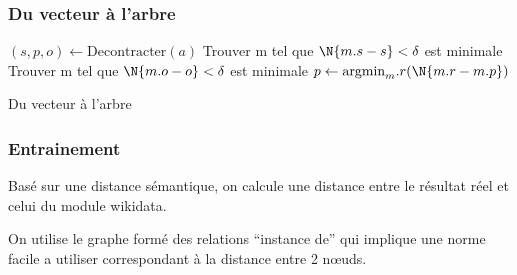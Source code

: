 \begin{frame}
\frametitle{Du vecteur à l'arbre}
\begin{algorithm}[H]
\DontPrintSemicolon  %
$(s,p,o) \gets \text{Decontracter}(a)$\;
Trouver m tel que $\N{m.s-s}<\delta$ est minimale \;
Trouver m tel que  $\N{m.o-o}<\delta$ est minimale \;
$p \gets \text{argmin}_m.r (\N{m.r-m.p})$\;
\;
\caption{ Du vecteur à l'arbre }
\end{algorithm}

\end{frame}


\begin{frame}
\frametitle{Entrainement}
Basé sur une distance sémantique, on calcule une distance entre le résultat réel et celui du module wikidata.

On utilise le graphe formé des relations ``instance de'' qui implique une norme facile a utiliser correspondant à la distance entre 2 nœuds.
\end{frame} 
